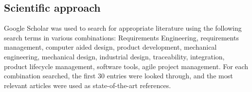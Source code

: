 



    \subsection*{Scientific approach}
    Google Scholar was used to search for appropriate literature using the following search terms in various combinations: Requirements Engineering, requirements management, computer aided design, product development, mechanical engineering, mechanical design, industrial design, traceability, integration, product lifecycle management, software tools, agile project management. For each combination searched, the first 30 entries were looked through, and the most relevant articles were used as state-of-the-art references. 

